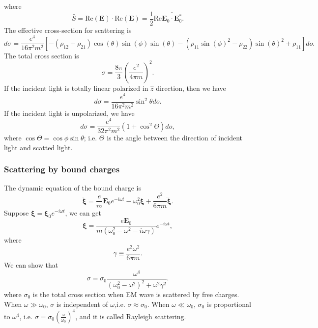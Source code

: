 where
\[\bar{S} = \overline{\mathrm{Re}(\bm{E})\cdot \mathrm{Re}(\bm{E})} = \frac{1}{2}\mathrm{Re}\overline{\bm{E}_0 \cdot \bm{E}^*_0}.\]
The effective cross-section for scattering is
\[d\sigma = \frac{e^4}{16\pi^2 m^2}[-(\rho_{12}+\rho_{21})\cos\left({\theta}\right)\sin\left({\phi}\right)
\sin\left({\theta}\right) - {\left(\rho_{11} \sin\left({\phi}\right)^{2}
- \rho_{22}\right)} \sin\left({\theta}\right)^{2} + \rho_{11} ]do.\]
The total cross section is
\[\sigma = \frac{8\pi}{3} \left( \frac{e^2}{4\pi m} \right)^2.\]
If the incident light is totally linear polarized in $\hat{z}$ direction, then we have
\[d\sigma = \frac{e^4}{16\pi^2 m^2} \sin^2\theta do.\]
If the incident light is unpolarized, we have
\[d\sigma = \frac{e^4}{32\pi^2 m^2}\left(1 +  \cos^2\Theta \right)do,\]
where $\cos\Theta = \cos\phi\sin\theta$; i.e. $\Theta$ is the angle between the direction of incident light and scatted light.

\subsubsection{Scattering by bound charges}
The dynamic equation of the bound charge is
\[\ddot{\bm{\xi}} = \frac{e}{m}\bm{E}_0e^{-i\omega t} - \omega_0^2 \bm{\xi} + \frac{e^2}{6\pi m} \dddot{\bm{\xi}}.\]
Suppose $\bm{\xi} = \bm{\xi}_0 e^{-i\omega t}$, we can get
\[\bm{\xi} = \frac{e\bm{E}_0}{m(\omega_0^2 - \omega^2 - i\omega \gamma)} e^{-i\omega t},\]
where
\[\gamma \equiv \frac{e^2 \omega^2}{6\pi m}.\]
We can show that
\[\sigma = \sigma_0 \frac{\omega^4}{(\omega_0^2-\omega^2)^2 + \omega^2 \gamma^2}.\]
where $\sigma_0$ is the total cross section when EM wave is scattered by free charges. When $\omega \gg \omega_0$, $\sigma$ is independent of $\omega$,i.e. $\sigma \approx \sigma_0$. When $\omega \ll \omega_0$, $\sigma_0$ is proportional to $\omega^4$, i.e. $\sigma = \sigma_0 \left(\frac{\omega}{\omega_0}\right)^4$, and it is called Rayleigh scattering.

